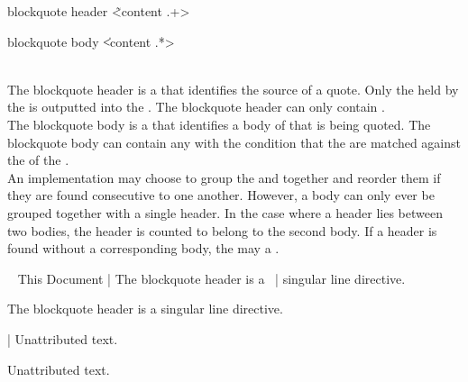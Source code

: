 \begin{identifier}{blockquote header}
\~ <content .+>
\end{identifier}
\begin{identifier}{blockquote body}
\| <content .*>
\end{identifier}
 \\

The blockquote header is a  that identifies the source of a quote. Only the  held by the  is outputted into the . The blockquote header can only contain . \\

The blockquote body is a  that identifies a body of  that is being quoted. The blockquote body can contain any  with the condition that the  are matched against the  of the . \\

An implementation may choose to group the  and  together and reorder them if they are found consecutive to one another. However, a body can only ever be grouped together with a single header. In the case where a header lies between two bodies, the header is counted to belong to the second body. If a header is found without a corresponding body, the  may  a . \\

\begin{examples}
  \begin{examplesource}
~ This Document
| The blockquote header is a \
| singular line directive.
  \end{examplesource}
  \begin{exampleoutput}
    \begin{blockquote}
      The blockquote header is a singular line directive.
    \end{blockquote}
  \end{exampleoutput}
  \begin{examplesource}
| Unattributed text.
  \end{examplesource}
  \begin{exampleoutput}
    \begin{blockquote}
      Unattributed text.
    \end{blockquote}
  \end{exampleoutput}
\end{examples}

